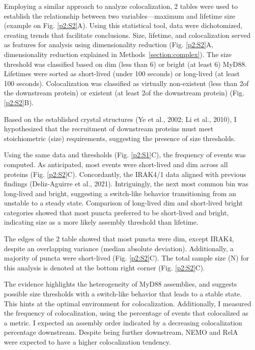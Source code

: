 Employing a similar approach to analyze colocalization, 2 tables were used to establish the relationship between two variables—maximum and lifetime size (example on Fig. \ref{p2:S2}A). Using this statistical tool, data were dichotomized, creating trends that facilitate conclusions. Size, lifetime, and colocalization served as features for analysis using dimensionality reduction (Fig. \ref{p2:S2}A, dimensionality reduction explained in Methods~\ref{section:complex}). The size threshold was classified based on dim (less than 6\times) or bright (at least 6\times) MyD88. Lifetimes were sorted as short-lived (under 100 seconds) or long-lived (at least 100 seconds). Colocalization was classified as virtually non-existent (less than 2\times of the downstream protein) or existent (at least 2\times of the downstream protein) (Fig. \ref{p2:S2}B).

Based on the established crystal structures (Ye et al., 2002; Li et al., 2010), I hypothesized that the recruitment of downstream proteins must meet stoichiometric (size) requirements, suggesting the presence of size thresholds.

Using the same data and thresholds (Fig. \ref{p2:S1}C), the frequency of events was computed. As anticipated, most events were short-lived and dim across all proteins (Fig. \ref{p2:S2}C). Concordantly, the IRAK4/1 data aligned with previous findings (Deliz-Aguirre et al., 2021). Intriguingly, the next most common bin was long-lived and bright, suggesting a switch-like behavior transitioning from an unstable to a steady state. Comparison of long-lived dim and short-lived bright categories showed that most puncta preferred to be short-lived and bright, indicating size as a more likely assembly threshold than lifetime.

The edges of the 2 table showed that most puncta were dim, except IRAK4, despite an overlapping variance (median absolute deviation). Additionally, a majority of puncta were short-lived (Fig. \ref{p2:S2}C). The total sample size (N) for this analysis is denoted at the bottom right corner (Fig. \ref{p2:S2}C).

The evidence highlights the heterogeneity of MyD88 assemblies, and suggests possible size thresholds with a switch-like behavior that leads to a stable state. This hints at the optimal environment for colocalization. Additionally, I measured the frequency of colocalization, using the percentage of events that colocalized as a metric. I expected an assembly order indicated by a decreasing colocalization percentage downstream. Despite being further downstream, NEMO and RelA were expected to have a higher colocalization tendency.

